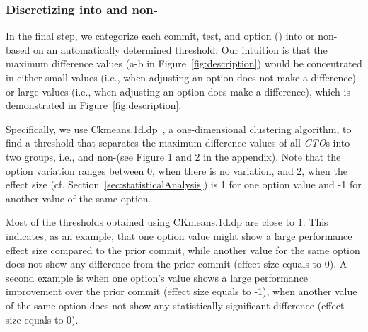 

\subsubsection{Discretizing \instance into \inconsistent and non-\inconsistent}
\label{sec:discretizing}
In the final step, we categorize each commit, test, and option (\instance) into \inconsistent or non-\inconsistent %
based on an automatically determined threshold. Our intuition is that the maximum difference values (a-b in Figure~\ref{fig:description}) would be concentrated in either small values %
(i.e., when adjusting an option does not make a difference) or large values (i.e., when adjusting an option does make a difference), which is demonstrated in Figure~\ref{fig:description}. %

Specifically, we use Ckmeans.1d.dp~\cite{Ckmeans138:online}, a one-dimensional clustering algorithm, to find a threshold that separates the maximum difference values of all \emph{CTO}s %
into two groups, i.e., \inconsistent and non-\inconsistent (see Figure 1 and 2 in the appendix). 
Note that the option variation ranges between 0, when there is no variation, and 2, when the effect size (cf. Section~\ref{sec:statisticalAnalysis}) is 1 for one option value and -1 for another value of the same option.

Most of the thresholds obtained using CKmeans.1d.dp are close to 1. This indicates, as an example, that one option value might show a large performance effect size compared to the prior commit, while another value for the same option does not show any difference from the prior commit (effect size equals to 0). A second example is when one option's value shows a large performance improvement over the prior commit (effect size equals to -1), when another value of the same option does not show any statistically significant difference (effect size equals to 0).


